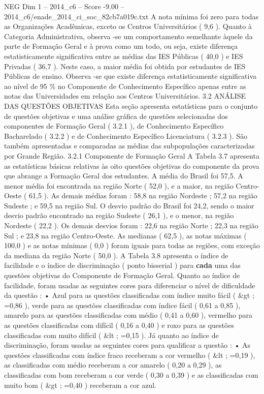 \begin{textsample}{NEG Dim 1 – 2014\_c6 – Score -9.00 – 2014\_c6/enade\_2014\_ci\_soc\_82cb7a019c.txt}
A nota mínima foi zero para todas as Organizações Acadêmicas, exceto os Centros Universitários ( 9,6 ).
Quanto à Categoria Administrativa, observa -se um comportamento semelhante àquele da parte de Formação Geral e à prova como um todo, ou seja, existe diferença estatisticamente significativa entre as médias das IES Públicas ( 40,0 ) e IES Privadas ( 36,7 ).
Neste caso, a maior média foi obtida por estudantes de IES Públicas de ensino.
Observa -se que existe diferença estatisticamente significativa ao nível de 95 \% no Componente de Conhecimento Específico apenas entre as notas das Universidades em relação aos Centros Universitários. 3.2 ANÁLISE DAS QUESTÕES OBJETIVAS Esta seção apresenta estatísticas para o conjunto de questões objetivas e uma análise gráfica de questões selecionadas dos componentes de Formação Geral ( 3.2.1 ), de Conhecimento Específico Bacharelado ( 3.2.2 ) e de Conhecimento Específico Licenciatura ( 3.2.3 ).
São também apresentadas e comparadas as médias das subpopulações caracterizadas por Grande Região. 3.2.1 Componente de Formação Geral A Tabela 3.7 apresenta as estatísticas básicas relativas às oito questões objetivas do componente da prova que abrange a Formação Geral dos estudantes.
A média do Brasil foi 57,5.
A menor média foi encontrada na região Norte ( 52,0 ), e a maior, na região Centro-Oeste ( 61,5 ).
As demais médias foram : 58,8 na região Nordeste ; 57,2 na região Sudeste ; e 59,5 na região Sul.
O desvio padrão do Brasil foi 24,2, sendo o maior desvio padrão encontrado na região Sudeste ( 26,1 ), e o menor, na região Nordeste ( 22,2 ).
Os demais desvios foram : 22,6 na região Norte ; 22,3 na região Sul ; e 23,8 na região Centro-Oeste.
As medianas ( 62,5 ), as notas máximas ( 100,0 ) e as notas mínimas ( 0,0 ) foram iguais para todas as regiões, com exceção da mediana da região Norte ( 50,0 ).
A Tabela 3.8 apresenta o índice de facilidade e o índice de discriminação ( ponto bisserial ) para \textbf{cada} uma das questões objetivas do Componente de Formação Geral.
Quanto ao índice de facilidade, foram usadas as seguintes cores para diferenciar o nível de dificuldade da questão : • Azul para as questões classificadas com índice muito fácil ( \&gt ; =0,86 ), verde para as questões classificadas com índice fácil ( 0,61 a 0,85 ), amarelo para as questões classificadas com médio ( 0,41 a 0,60 ), vermelho para as questões classificadas com difícil ( 0,16 a 0,40 ) e roxo para as questões classificadas com muito difícil ( \&lt ; =0,15 ).
Já quanto ao índice de discriminação, foram usadas as seguintes cores para qualificar a questão : • As questões classificadas com índice fraco receberam a cor vermelho ( \&lt ; =0,19 ), as classificadas com médio receberam a cor amarelo ( 0,20 a 0,29 ), as classificadas com bom receberam a cor verde ( 0,30 a 0,39 ) e as classificadas com muito bom ( \&gt ; =0,40 ) receberam a cor azul.

\end{textsample}
